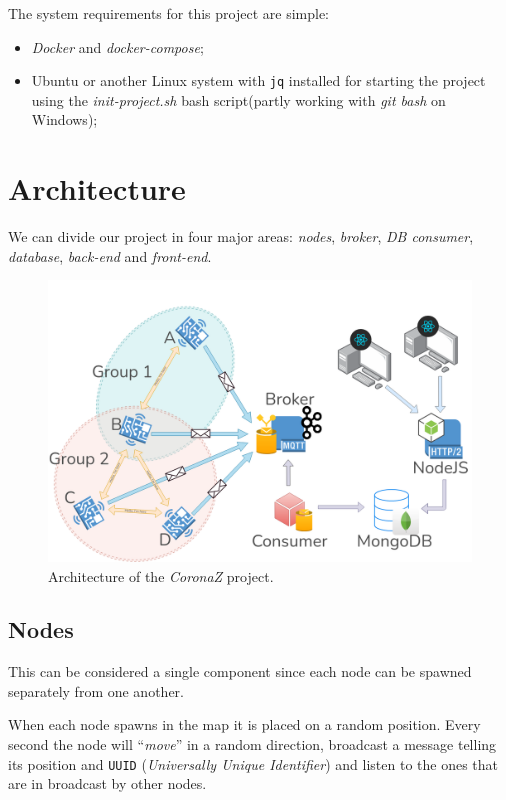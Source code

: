 \documentclass[conference]{IEEEtran}
\begin{document}
		The system requirements for this project are simple:
		\begin{itemize}
			\item \textit{Docker} and \textit{docker-compose};
			\item Ubuntu or another Linux system with \texttt{jq} installed for starting the project using the \textit{init-project.sh} bash script(partly working with \textit{git bash} on Windows);
		\end{itemize}

\section{Architecture}\label{sec:architecture}
	
	We can divide our project in four major areas: \textit{nodes}, \textit{broker}, \textit{DB consumer}, \textit{database}, \textit{back-end} and \textit{front-end}.

	\begin{figure}[htbp]
		\centerline{\includegraphics[width=\linewidth]{img/coronaz.png}}
		\caption{Architecture of the \textit{CoronaZ} project.}
		\label{fig:architecture}
	\end{figure}
	
	\subsection{Nodes}
	
		This can be considered a single component since each node can be spawned separately from one another.
		
		When each node spawns in the map it is placed on a random position.
		Every second the node will ``\textit{move}'' in a random direction, broadcast a message telling its position and \texttt{UUID} (\textit{Universally Unique Identifier}) and listen to the ones that are in broadcast by other nodes.
		
\end{document}

